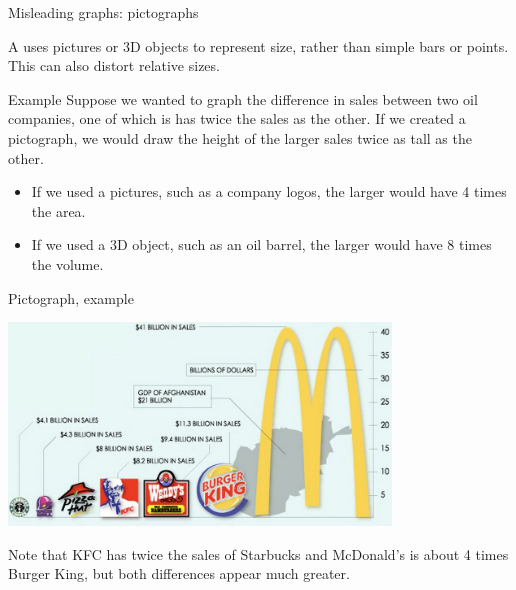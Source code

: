 \documentclass[xcolor=table, aspectratio=169, bigger]{beamer}
\begin{document}
\begin{frame}{Misleading graphs: pictographs}
\begin{block}{}
A  uses pictures or 3D objects to represent size, rather than simple bars or points. This can also distort relative sizes.
\end{block}

\pause
\begin{exampleblock}{Example}
Suppose we wanted to graph the difference in sales between two oil companies, one of which is has twice the sales as the other. If we created a pictograph, we would draw the height of the larger sales twice as tall as the other.
\begin{itemize}
\item If we used a pictures, such as a company logos, the larger would have 4 times the area.
\item If we used a 3D object, such as an oil barrel, the larger would have 8 times the volume. 
\end{itemize}
\end{exampleblock}
\end{frame}

\begin{frame}{Pictograph, example}
\begin{center}
\includegraphics[width=4in]{../images/wk04_fastfood_pictograph}
\end{center}
\begin{block}{}
Note that KFC has twice the sales of Starbucks and McDonald's is about 4 times Burger King, but both differences appear much greater.
\end{block}
\end{frame}
\end{document}
